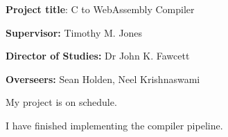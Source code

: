 \documentclass[12pt, a4paper]{article}
\begin{document}
\textbf{Project title}: C to WebAssembly Compiler

\textbf{Supervisor:} Timothy M. Jones

\textbf{Director of Studies:} Dr John K. Fawcett

\textbf{Overseers:} Sean Holden, Neel Krishnaswami

\vspace{3\parskip}

My project is on schedule.

I have finished implementing the compiler pipeline.
\end{document}
